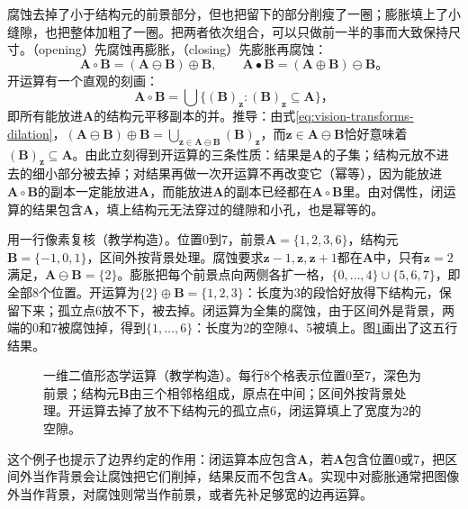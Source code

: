 腐蚀去掉了小于结构元的前景部分，但也把留下的部分削瘦了一圈；膨胀填上了小缝隙，也把整体加粗了一圈。把两者依次组合，可以只做前一半的事而大致保持尺寸。（opening）先腐蚀再膨胀，（closing）先膨胀再腐蚀：
\begin{equation}
  \bm{A}\circ\bm{B}=(\bm{A}\ominus\bm{B})\oplus\bm{B},\qquad
  \bm{A}\bullet\bm{B}=(\bm{A}\oplus\bm{B})\ominus\bm{B}\text{。}
  \label{eq:vision-transforms-opening-closing}
\end{equation}
开运算有一个直观的刻画：
\begin{equation}
  \bm{A}\circ\bm{B}=\bigcup\bigl\{(\bm{B})_{\bm{z}}:(\bm{B})_{\bm{z}}\subseteq\bm{A}\bigr\}\text{，}
  \label{eq:vision-transforms-opening-fit}
\end{equation}
即所有能放进$\bm{A}$的结构元平移副本的并。推导：由式\eqref{eq:vision-transforms-dilation}，$(\bm{A}\ominus\bm{B})\oplus\bm{B}=\bigcup_{\bm{z}\in\bm{A}\ominus\bm{B}}(\bm{B})_{\bm{z}}$，而$\bm{z}\in\bm{A}\ominus\bm{B}$恰好意味着$(\bm{B})_{\bm{z}}\subseteq\bm{A}$。由此立刻得到开运算的三条性质：结果是$\bm{A}$的子集；结构元放不进去的细小部分被去掉；对结果再做一次开运算不再改变它（幂等），因为能放进$\bm{A}\circ\bm{B}$的副本一定能放进$\bm{A}$，而能放进$\bm{A}$的副本已经都在$\bm{A}\circ\bm{B}$里。由对偶性，闭运算的结果包含$\bm{A}$，填上结构元无法穿过的缝隙和小孔，也是幂等的。

用一行像素复核（教学构造）。位置0到7，前景$\bm{A}=\{1,2,3,6\}$，结构元$\bm{B}=\{-1,0,1\}$，区间外按背景处理。腐蚀要求$\bm{z}-1,\bm{z},\bm{z}+1$都在$\bm{A}$中，只有$\bm{z}=2$满足，$\bm{A}\ominus\bm{B}=\{2\}$。膨胀把每个前景点向两侧各扩一格，$\{0,\ldots,4\}\cup\{5,6,7\}$，即全部8个位置。开运算为$\{2\}\oplus\bm{B}=\{1,2,3\}$：长度为3的段恰好放得下结构元，保留下来；孤立点6放不下，被去掉。闭运算为全集的腐蚀，由于区间外是背景，两端的0和7被腐蚀掉，得到$\{1,\ldots,6\}$：长度为2的空隙4、5被填上。图\ref{fig:vision-transforms-morphology}画出了这五行结果。

\begin{figure}[htbp]
  \centering
  
  \caption{一维二值形态学运算（教学构造）。每行8个格表示位置0至7，深色为前景；结构元$\bm{B}$由三个相邻格组成，原点在中间；区间外按背景处理。开运算去掉了放不下结构元的孤立点6，闭运算填上了宽度为2的空隙。}
  \label{fig:vision-transforms-morphology}
\end{figure}

这个例子也提示了边界约定的作用：闭运算本应包含$\bm{A}$，若$\bm{A}$包含位置0或7，把区间外当作背景会让腐蚀把它们削掉，结果反而不包含$\bm{A}$。实现中对膨胀通常把图像外当作背景，对腐蚀则常当作前景，或者先补足够宽的边再运算。

